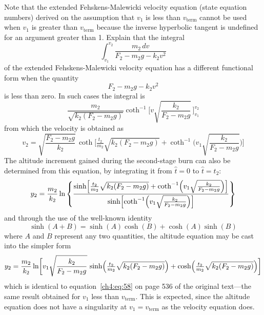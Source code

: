 Note that the extended Fehskens-Malewicki velocity equation (state equation numbers) derived on the
assumption that $v_1$ is less than $v_{\mathrm{term}}$ cannot be used when $v_1$ is greater than
$v_{\mathrm{term}}$ because the inverse hyperbolic tangent is undefined for an argument greater than 1.
Explain that the integral
\begin{equation*}
\int_{v_1}^{v_2}\frac{m_2\,dv}{F_2 - m_2g - k_2v^{2}}
\end{equation*}
of the extended Fehskens-Malewicki velocity equation has a different functional form when the quantity
\begin{equation*}
F_2 - m_2g - k_2v^{2}
\end{equation*}
is less than zero. In such cases the integral is
\begin{equation*}
\frac{m_2}{\sqrt{k_2(F_2 - m_2g)}}\coth^{-1}\biggl[v\sqrt{\frac{k_2}{F_2 - m_2g}}\,\biggr]_{v_1}^{v_2}
\end{equation*}
from which the velocity is obtained as
\begin{equation*}
v_2 = \sqrt{\frac{F_2 - m_2g}{k_2}}\,\coth\biggl[\tfrac{t_2}{m_2}\sqrt{k_2(F_2 - m_2g)}
  + \coth^{-1}\biggl(v_1\sqrt{\frac{k_2}{F_2 - m_2g}}\biggr)\biggr]
\end{equation*}
The altitude increment gained during the second-stage burn can also be determined from this equation, by
integrating it from $\hat{t} = 0$ to $\hat{t} = t_2$:
\begin{equation*}
y_2 = \frac{m_2}{k_2}\ln\left\{\frac{\sinh\Bigl[\tfrac{t_2}{m_2}\sqrt{k_2(F_2 - m_2g)}
  + \coth^{-1}\Bigl(v_1\sqrt{\frac{k_2}{F_2 - m_2g}}\Bigr)\Bigr]}{\sinh\Bigl[\coth^{-1}\Bigl(v_1
  \sqrt{\frac{k_2}{F_2 - m_2g}}\Bigr)\Bigr]}\right\}
\end{equation*}
and through the use of the well-known identity
\begin{equation*}
\sinh(A + B) = \sinh(A)\cosh(B) + \cosh(A)\sinh(B)
\end{equation*}
where $A$ and $B$ represent any two quantities, the altitude equation may be cast into the simpler form
\begin{equation*}
y_2 = \frac{m_2}{k_2}\ln\biggl[v_1\sqrt{\frac{k_2}{F_2 - m_2g}}\,\sinh\Bigl(\tfrac{t_2}{m_2}
  \sqrt{k_2(F_2 - m_2g)}\Bigr) + \cosh\Bigl(\tfrac{t_2}{m_2}\sqrt{k_2(F_2 - m_2g)}\Bigr)\biggr]
\end{equation*}
which is identical to equation~\eqref{ch4:eq:58} on page 536 of the original text---the same result
obtained for $v_1$ less than $v_{\mathrm{term}}$. This is expected, since the altitude equation does not
have a singularity at $v_1 = v_{\mathrm{term}}$ as the velocity equation does.

